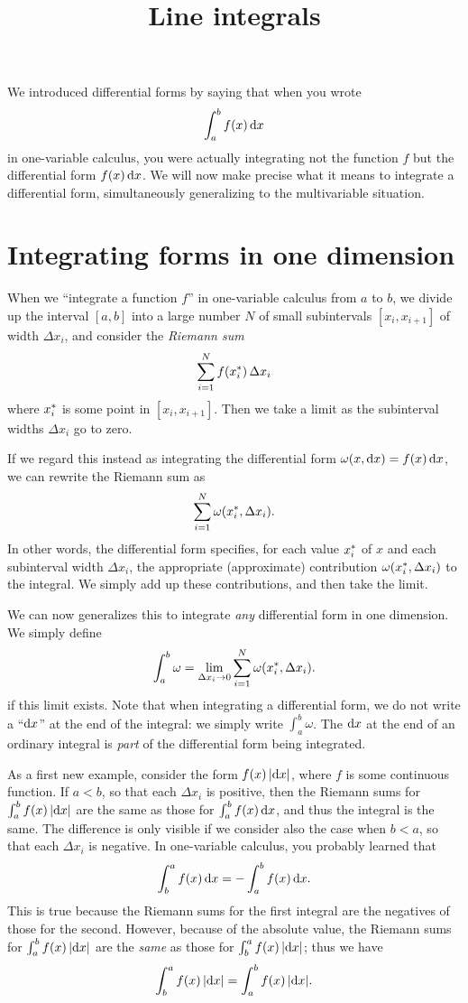 \documentclass[12pt]{amsart}
\title{Line integrals}
\begin{document}
\maketitle

We introduced differential forms by saying that when you wrote
\[ \int_a^b f(x) \,\mathrm{d} x \]
in one-variable calculus, you were actually integrating not the function $f$ but the differential form $f(x)\,\mathrm{d} x$.
We will now make precise what it means to integrate a differential form, simultaneously generalizing to the multivariable situation.

\section{Integrating forms in one dimension}
\label{sec:integrating-forms}

When we ``integrate a function $f$'' in one-variable calculus from $a$ to $b$, we divide up the interval $[a,b]$ into a large number $N$ of small subintervals $[x_i,x_{i+1}]$ of width $\Delta x_i$, and consider the \emph{Riemann sum}
\[ \sum_{i=1}^N f(x_{i}^*)\, \Delta x_i \]
where $x_{i}^*$ is some point in $[x_i,x_{i+1}]$.
Then we take a limit as the subinterval widths $\Delta x_i$ go to zero.

If we regard this instead as integrating the differential form $\omega(x,\mathrm{d} x) = f(x)\, \mathrm{d} x$, we can rewrite the Riemann sum as
\[ \sum_{i=1}^N \omega(x_{i}^*,\Delta x_i). \]
In other words, the differential form specifies, for each value $x_{i}^*$ of $x$ and each subinterval width $\Delta x_i$, the appropriate (approximate) contribution $\omega(x_{i}^*,\Delta x_i)$ to the integral.
We simply add up these contributions, and then take the limit.

We can now generalizes this to integrate \emph{any} differential form in one dimension.
We simply define
\[ \int_a^b \omega = \lim_{\Delta x_i \to 0} \sum_{i=1}^N \omega(x_{i}^*,\Delta x_i). \]
if this limit exists.
Note that when integrating a differential form, we do not write a ``$\mathrm{d} x$'' at the end of the integral: we simply write $\int_a^b \omega$.
The $\mathrm{d} x$ at the end of an ordinary integral is \emph{part} of the differential form being integrated.

\begin{eg}
  As a first new example, consider the form $f(x) \, |\mathrm{d} x|$, where $f$ is some continuous function.
  If $a<b$, so that each $\Delta x_i$ is positive, then the Riemann sums for $\int_a^b f(x) \, |\mathrm{d} x|$ are the same as those for $\int_a^b f(x) \, \mathrm{d} x$, and thus the integral is the same.
  The difference is only visible if we consider also the case when $b<a$, so that each $\Delta x_i$ is negative.
  In one-variable calculus, you probably learned that
  \[ \int_b^a f(x)\,\mathrm{d} x = - \int_a^b f(x) \,\mathrm{d} x. \]
  This is true because the Riemann sums for the first integral are the negatives of those for the second.
  However, because of the absolute value, the Riemann sums for $\int_a^b f(x) \, |\mathrm{d} x|$ are the \emph{same} as those for $\int_b^a f(x) \, |\mathrm{d} x|$; thus we have
  \[ \int_b^a f(x)\,|\mathrm{d} x| = \int_a^b f(x) \,|\mathrm{d} x|. \]
\end{eg}
\end{document}
